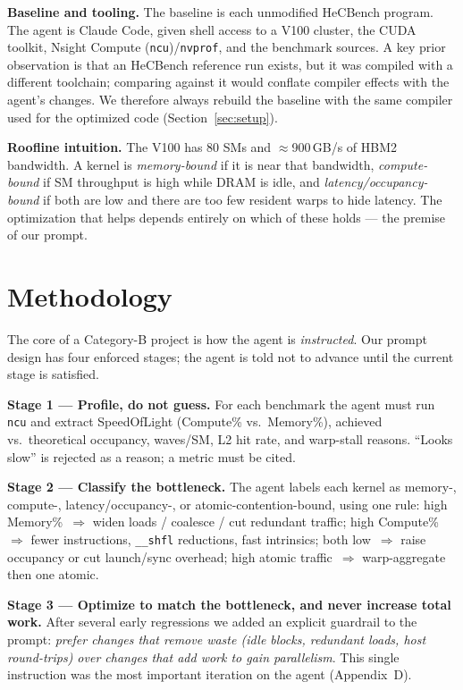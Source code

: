 \documentclass[conference]{IEEEtran}
\begin{document}
\textbf{Baseline and tooling.}
The baseline is each unmodified HeCBench program. The agent is Claude Code, given
shell access to a V100 cluster, the CUDA toolkit, Nsight Compute
(\texttt{ncu})/\texttt{nvprof}, and the benchmark sources. A key prior observation
is that an HeCBench reference run exists, but it was compiled with a different
toolchain; comparing against it would conflate compiler effects with the agent's
changes. We therefore always rebuild the baseline with the same compiler used for
the optimized code (Section~\ref{sec:setup}).

\textbf{Roofline intuition.}
The V100 has 80 SMs and $\approx$900\,GB/s of HBM2 bandwidth. A kernel is
\emph{memory-bound} if it is near that bandwidth, \emph{compute-bound} if SM
throughput is high while DRAM is idle, and \emph{latency/occupancy-bound} if both
are low and there are too few resident warps to hide latency. The optimization
that helps depends entirely on which of these holds --- the premise of our prompt.

\section{Methodology}
The core of a Category-B project is how the agent is \emph{instructed}. Our prompt
design has four enforced stages; the agent is told not to advance until the
current stage is satisfied.

\textbf{Stage 1 --- Profile, do not guess.} For each benchmark the agent must run
\texttt{ncu} and extract SpeedOfLight (Compute\% vs.\ Memory\%), achieved vs.\
theoretical occupancy, waves/SM, L2 hit rate, and warp-stall reasons. ``Looks
slow'' is rejected as a reason; a metric must be cited.

\textbf{Stage 2 --- Classify the bottleneck.} The agent labels each kernel as
memory-, compute-, latency/occupancy-, or atomic-contention-bound, using one
rule: high Memory\%~$\Rightarrow$ widen loads / coalesce / cut redundant traffic;
high Compute\%~$\Rightarrow$ fewer instructions, \texttt{\_\_shfl} reductions,
fast intrinsics; both low~$\Rightarrow$ raise occupancy or cut launch/sync
overhead; high atomic traffic~$\Rightarrow$ warp-aggregate then one atomic.

\textbf{Stage 3 --- Optimize to match the bottleneck, and never increase total
work.} After several early regressions we added an explicit guardrail to the
prompt: \emph{prefer changes that remove waste (idle blocks, redundant loads,
host round-trips) over changes that add work to gain parallelism}. This single
instruction was the most important iteration on the agent (Appendix~D).
\end{document}
